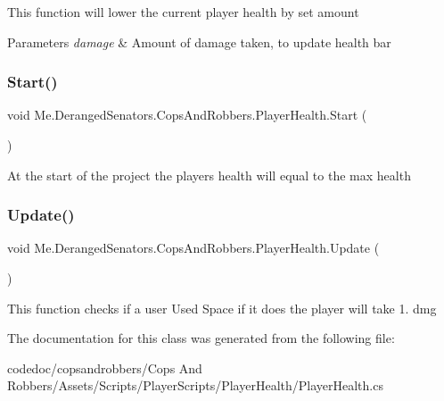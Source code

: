 This function will lower the current player health by set amount 


\begin{DoxyParams}{Parameters}
{\em damage} & Amount of damage taken, to update health bar\\
\hline
\end{DoxyParams}
\mbox{\label{classMe_1_1DerangedSenators_1_1CopsAndRobbers_1_1PlayerHealth_a738f74e006b34cc3584906614d9c6c75}} 
\subsubsection{\texorpdfstring{Start()}{Start()}}
{\footnotesize\ttfamily void Me.\+Deranged\+Senators.\+Cops\+And\+Robbers.\+Player\+Health.\+Start (\begin{DoxyParamCaption}{ }\end{DoxyParamCaption})\hspace{0.3cm}{\ttfamily [inline]}}



At the start of the project the player\textquotesingle{}s health will equal to the max health 

\mbox{\label{classMe_1_1DerangedSenators_1_1CopsAndRobbers_1_1PlayerHealth_a83cc2195c8a20f4ddef3d2d5e567c998}} 
\subsubsection{\texorpdfstring{Update()}{Update()}}
{\footnotesize\ttfamily void Me.\+Deranged\+Senators.\+Cops\+And\+Robbers.\+Player\+Health.\+Update (\begin{DoxyParamCaption}{ }\end{DoxyParamCaption})\hspace{0.3cm}{\ttfamily [inline]}}



This function checks if a user Used Space if it does the player will take 1. dmg 



The documentation for this class was generated from the following file\+:\begin{DoxyCompactItemize}
\item 
codedoc/copsandrobbers/\+Cops And Robbers/\+Assets/\+Scripts/\+Player\+Scripts/\+Player\+Health/Player\+Health.\+cs\end{DoxyCompactItemize}
